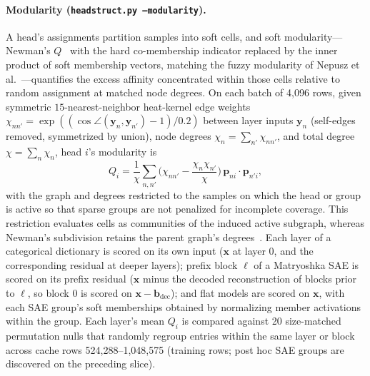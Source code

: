 \paragraph{Modularity (\texttt{headstruct.py --modularity}).}
A head's assignments partition samples into soft cells, and soft
modularity---Newman's $Q$~\cite{newman2006} with the hard co-membership
indicator replaced by the inner product of soft membership vectors,
matching the fuzzy modularity of Nepusz et al.~\cite[Eq.~14]{nepusz2008}---quantifies
the excess affinity concentrated within those cells relative to random
assignment at matched node degrees. On each batch of 4{,}096 rows, given
symmetric $15$-nearest-neighbor heat-kernel edge weights $\chi_{nn'} =
\exp((\cos\angle(\mathbf{y}_n, \mathbf{y}_{n'})-1)/0.2)$ between layer
inputs $\mathbf{y}_n$ (self-edges removed, symmetrized by union), node
degrees $\chi_n = \sum_{n'}\chi_{nn'}$, and total degree
$\chi = \sum_n\chi_n$, head $i$'s modularity is
\begin{equation}
	Q_i = \frac{1}{\chi}\sum_{n,n'}\Big(\chi_{nn'}
	- \frac{\chi_n\chi_{n'}}{\chi}\Big)\,
	\mathbf{p}_{ni}\cdot\mathbf{p}_{n'i},
	\label{eq:modularity}
\end{equation}
with the graph and degrees restricted to the samples on which the head or
group is active so that sparse groups are not penalized for incomplete
coverage. This restriction evaluates cells as communities of the induced
active subgraph, whereas Newman's subdivision retains the parent graph's
degrees~\cite{newman2006}. Each layer of a categorical dictionary is
scored on its own input ($\mathbf{x}$ at layer 0, and the corresponding
residual at deeper layers); prefix block $\ell$ of a Matryoshka SAE is
scored on its prefix
residual ($\mathbf{x}$ minus the decoded reconstruction of blocks prior to
$\ell$, so block 0 is scored on $\mathbf{x}-\mathbf{b}_{\mathrm{dec}}$);
and flat models are scored on $\mathbf{x}$, with each SAE group's soft
memberships obtained by normalizing member activations within the group.
Each layer's mean $Q_i$ is compared against 20 size-matched permutation
nulls that randomly regroup entries within the same layer or block across
cache rows 524{,}288--1{,}048{,}575 (training rows; post hoc SAE groups are
discovered on the preceding slice).

